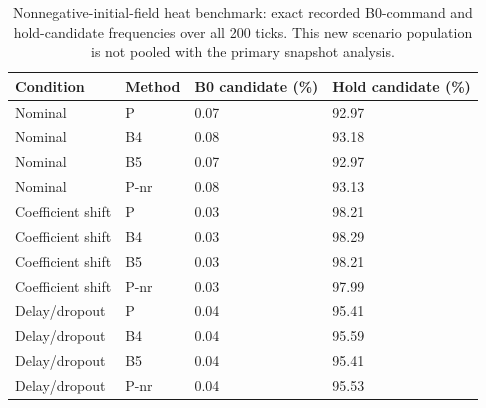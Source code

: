 \begin{table}[ht]
\caption{Nonnegative-initial-field heat benchmark: exact recorded B0-command and hold-candidate frequencies over all 200 ticks. This new scenario population is not pooled with the primary snapshot analysis.}\label{tab:choices_new_heat}
\centering\small
\begin{tabular}{@{}llll@{}}\toprule
Condition & Method & B0 candidate (\%) & Hold candidate (\%)\\\midrule
Nominal & P & 0.07 & 92.97 \\
Nominal & B4 & 0.08 & 93.18 \\
Nominal & B5 & 0.07 & 92.97 \\
Nominal & P-nr & 0.08 & 93.13 \\
Coefficient shift & P & 0.03 & 98.21 \\
Coefficient shift & B4 & 0.03 & 98.29 \\
Coefficient shift & B5 & 0.03 & 98.21 \\
Coefficient shift & P-nr & 0.03 & 97.99 \\
Delay/dropout & P & 0.04 & 95.41 \\
Delay/dropout & B4 & 0.04 & 95.59 \\
Delay/dropout & B5 & 0.04 & 95.41 \\
Delay/dropout & P-nr & 0.04 & 95.53 \\
\bottomrule\end{tabular}
\end{table}
